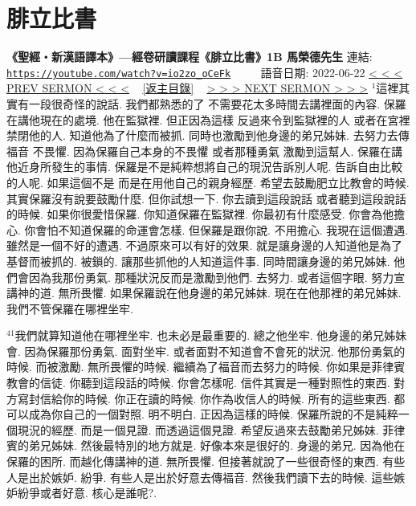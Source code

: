 \documentclass{book}
\begin{document}
\section{腓立比書}
\label{sec:io2zo_oCeFk}
\textbf{《聖經‧新漢語譯本》—經卷研讀課程《腓立比書》1B 馬榮德先生}
\newline
\newline
連結: \href{https://youtube.com/watch?v=io2zo_oCeFk}{\texttt{https://youtube.com/watch?v=io2zo\_oCeFk}} ~~~~ 語音日期: 2022-06-22
\newline
\newline
\hyperref[sec:HhgTqAX1BFU]{\small{< < < PREV SERMON < < <}}
~
\hyperref[sec:index]{\small{[返主目錄]}}
~
\hyperref[sec:XEYwTf6e19I]{\small{> > > NEXT SERMON > > >}}
\newline
\newline
$^{1}$這裡其實有一段很奇怪的說話.
我們都熟悉的了 不需要花太多時間去講裡面的內容.
保羅在講他現在的處境.
他在監獄裡.
但正因為這樣 反過來令到監獄裡的人 或者在宮裡禁閉他的人.
知道他為了什麼而被抓.
同時也激勵到他身邊的弟兄姊妹.
去努力去傳福音 不畏懼.
因為保羅自己本身的不畏懼 或者那種勇氣 激勵到這幫人.
保羅在講他近身所發生的事情.
保羅是不是純粹想將自己的現況告訴別人呢.
告訴自由比較的人呢.
如果這個不是 而是在用他自己的親身經歷.
希望去鼓勵肥立比教會的時候.
其實保羅沒有說要鼓勵什麼.
但你試想一下.
你去讀到這段說話 或者聽到這段說話的時候.
如果你很愛惜保羅.
你知道保羅在監獄裡.
你最初有什麼感受.
你會為他擔心.
你會怕不知道保羅的命運會怎樣.
但保羅是跟你說.
不用擔心.
我現在這個遭遇.
雖然是一個不好的遭遇.
不過原來可以有好的效果.
就是讓身邊的人知道他是為了基督而被抓的.
被鎖的.
讓那些抓他的人知道這件事.
同時間讓身邊的弟兄姊妹.
他們會因為我那份勇氣.
那種狀況反而是激勵到他們.
去努力.
或者這個字眼.
努力宣講神的道.
無所畏懼.
如果保羅說在他身邊的弟兄姊妹.
現在在他那裡的弟兄姊妹.
我們不管保羅在哪裡坐牢.

$^{41}$我們就算知道他在哪裡坐牢.
也未必是最重要的.
總之他坐牢.
他身邊的弟兄姊妹會.
因為保羅那份勇氣.
面對坐牢.
或者面對不知道會不會死的狀況.
他那份勇氣的時候.
而被激勵.
無所畏懼的時候.
繼續為了福音而去努力的時候.
你如果是菲律賓教會的信徒.
你聽到這段話的時候.
你會怎樣呢.
信件其實是一種對照性的東西.
對方寫封信給你的時候.
你正在讀的時候.
你作為收信人的時候.
所有的這些東西.
都可以成為你自己的一個對照.
明不明白.
正因為這樣的時候.
保羅所說的不是純粹一個現況的經歷.
而是一個見證.
而透過這個見證.
希望反過來去鼓勵弟兄姊妹.
菲律賓的弟兄姊妹.
然後最特別的地方就是.
好像本來是很好的.
身邊的弟兄.
因為他在保羅的困所.
而越化傳講神的道.
無所畏懼.
但接著就說了一些很奇怪的東西.
有些人是出於嫉妒.
紛爭.
有些人是出於好意去傳福音.
然後我們讀下去的時候.
這些嫉妒紛爭或者好意.
核心是誰呢?.
\end{document}
